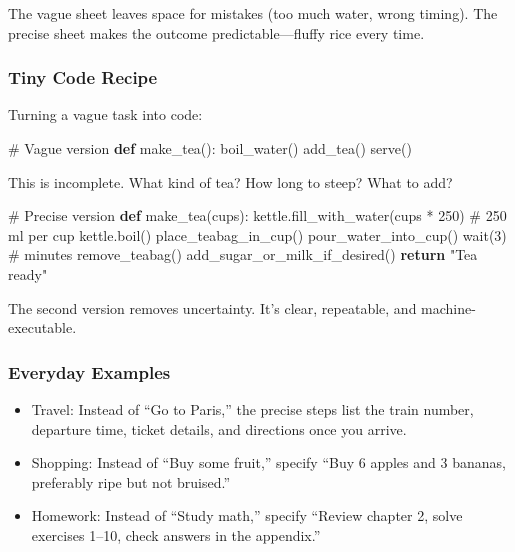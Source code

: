\documentclass[
  letterpaper,
  DIV=11,
  numbers=noendperiod]{scrreprt}
\newenvironment{Shaded}{\begin{snugshade}}{\end{snugshade}}
\newcommand{\CommentTok}[1]{\textcolor[rgb]{0.37,0.37,0.37}{#1}}
\newcommand{\ControlFlowTok}[1]{\textcolor[rgb]{0.00,0.23,0.31}{\textbf{#1}}}
\newcommand{\DecValTok}[1]{\textcolor[rgb]{0.68,0.00,0.00}{#1}}
\newcommand{\KeywordTok}[1]{\textcolor[rgb]{0.00,0.23,0.31}{\textbf{#1}}}
\newcommand{\NormalTok}[1]{\textcolor[rgb]{0.00,0.23,0.31}{#1}}
\newcommand{\OperatorTok}[1]{\textcolor[rgb]{0.37,0.37,0.37}{#1}}
\newcommand{\StringTok}[1]{\textcolor[rgb]{0.13,0.47,0.30}{#1}}
\providecommand{\tightlist}{%
  \setlength{\itemsep}{0pt}\setlength{\parskip}{0pt}}
\begin{document}
The vague sheet leaves space for mistakes (too much water, wrong
timing). The precise sheet makes the outcome predictable---fluffy rice
every time.

\subsubsection{Tiny Code Recipe}\label{tiny-code-recipe-1}

Turning a vague task into code:

\begin{Shaded}
\begin{Highlighting}[]
\CommentTok{\# Vague version}
\KeywordTok{def}\NormalTok{ make\_tea():}
\NormalTok{    boil\_water()}
\NormalTok{    add\_tea()}
\NormalTok{    serve()}
\end{Highlighting}
\end{Shaded}

This is incomplete. What kind of tea? How long to steep? What to add?

\begin{Shaded}
\begin{Highlighting}[]
\CommentTok{\# Precise version}
\KeywordTok{def}\NormalTok{ make\_tea(cups):}
\NormalTok{    kettle.fill\_with\_water(cups }\OperatorTok{*} \DecValTok{250}\NormalTok{)   }\CommentTok{\# 250 ml per cup}
\NormalTok{    kettle.boil()}
\NormalTok{    place\_teabag\_in\_cup()}
\NormalTok{    pour\_water\_into\_cup()}
\NormalTok{    wait(}\DecValTok{3}\NormalTok{)  }\CommentTok{\# minutes}
\NormalTok{    remove\_teabag()}
\NormalTok{    add\_sugar\_or\_milk\_if\_desired()}
    \ControlFlowTok{return} \StringTok{"Tea ready"}
\end{Highlighting}
\end{Shaded}

The second version removes uncertainty. It's clear, repeatable, and
machine-executable.

\subsubsection{Everyday Examples}\label{everyday-examples}

\begin{itemize}
\tightlist
\item
  Travel: Instead of ``Go to Paris,'' the precise steps list the train
  number, departure time, ticket details, and directions once you
  arrive.
\item
  Shopping: Instead of ``Buy some fruit,'' specify ``Buy 6 apples and 3
  bananas, preferably ripe but not bruised.''
\item
  Homework: Instead of ``Study math,'' specify ``Review chapter 2, solve
  exercises 1--10, check answers in the appendix.''
\end{itemize}
\end{document}
